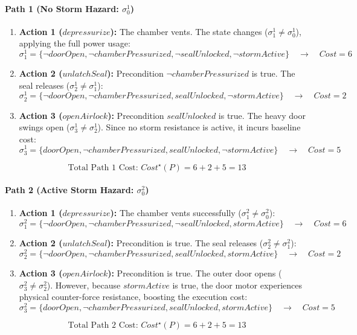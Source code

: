 \documentclass[11pt]{article}
\begin{document}
\paragraph{Path 1 (No Storm Hazard: $\sigma_0^1$)}
\begin{enumerate}
    \item \textbf{Action 1 ($depressurize$):} The chamber vents. The state changes ($\sigma_1^1 \neq \sigma_0^1$), applying the full power usage:
    \[ \sigma_1^1 = \{\neg doorOpen, \neg chamberPressurized, \neg sealUnlocked, \neg stormActive\} \quad \rightarrow \quad Cost = 6 \]

    \item \textbf{Action 2 ($unlatchSeal$):} Precondition $\neg chamberPressurized$ is true. The seal releases ($\sigma_2^1 \neq \sigma_1^1$):
    \[ \sigma_2^1 = \{\neg doorOpen, \neg chamberPressurized, sealUnlocked, \neg stormActive\} \quad \rightarrow \quad Cost = 2 \]

    \item \textbf{Action 3 ($openAirlock$):} Precondition $sealUnlocked$ is true. The heavy door swings open ($\sigma_3^1 \neq \sigma_2^1$). Since no storm resistance is active, it incurs baseline cost:
    \[ \sigma_3^1 = \{doorOpen, \neg chamberPressurized, sealUnlocked, \neg stormActive\} \quad \rightarrow \quad Cost = 5 \]
\end{enumerate}
\[ \text{Total Path 1 Cost: } Cost^\star(P) = 6 + 2 + 5 = 13 \]

\paragraph{Path 2 (Active Storm Hazard: $\sigma_0^2$)}
\begin{enumerate}
    \item \textbf{Action 1 ($depressurize$):} The chamber vents successfully ($\sigma_1^2 \neq \sigma_0^2$):
    \[ \sigma_1^2 = \{\neg doorOpen, \neg chamberPressurized, \neg sealUnlocked, stormActive\} \quad \rightarrow \quad Cost = 6 \]

    \item \textbf{Action 2 ($unlatchSeal$):} Precondition is true. The seal releases ($\sigma_2^2 \neq \sigma_1^2$):
    \[ \sigma_2^2 = \{\neg doorOpen, \neg chamberPressurized, sealUnlocked, stormActive\} \quad \rightarrow \quad Cost = 2 \]

    \item \textbf{Action 3 ($openAirlock$):} Precondition is true. The outer door opens ($\sigma_3^2 \neq \sigma_2^2$). However, because $stormActive$ is true, the door motor experiences physical counter-force resistance, boosting the execution cost:
    \[ \sigma_3^2 = \{doorOpen, \neg chamberPressurized, sealUnlocked, stormActive\} \quad \rightarrow \quad Cost = 5 \]
\end{enumerate}
\[ \text{Total Path 2 Cost: } Cost^\star(P) = 6 + 2 + 5 = 13 \]
\end{document}
